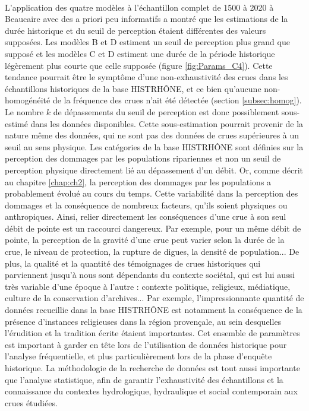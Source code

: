 	\paragraph{} L'application des quatre modèles à l'échantillon complet de 1500 à 2020 à Beaucaire avec des a priori peu informatifs a montré que les estimations de la durée historique et du seuil de perception étaient différentes des valeurs supposées. Les modèles B et D estiment un seuil de perception plus grand que supposé et les modèles C et D estiment une durée de la période historique légèrement plus courte que celle supposée (figure \ref{fig:Params_C4}). Cette tendance pourrait être le symptôme d'une non-exhaustivité des crues dans les échantillons historiques de la base HISTRHÔNE, et ce bien qu'aucune non-homogénéité de la fréquence des crues n'ait été détectée (section \ref{subsec:homog}). Le nombre $k$ de dépassements du seuil de perception est donc possiblement sous-estimé dans les données disponibles. Cette sous-estimation pourrait provenir de la nature même des données, qui ne sont pas des données de crues supérieures à un seuil au sens physique. Les catégories de la base HISTRHÔNE sont définies sur la perception des dommages par les populations ripariennes et non un seuil de perception physique directement lié au dépassement d'un débit. Or, comme décrit au chapitre \ref{chap:ch2}, la perception des dommages par les populations a probablement évolué au cours du temps. Cette variabilité dans la perception des dommages et la conséquence de nombreux facteurs, qu'ils soient physiques ou anthropiques. Ainsi, relier directement les conséquences d'une crue à son seul débit de pointe est un raccourci dangereux. Par exemple, pour un même débit de pointe, la perception de la gravité d'une crue peut varier selon la durée de la crue, le niveau de protection, la rupture de digues, la densité de population... De plus, la qualité et la quantité des témoignages de crues historiques qui parviennent jusqu'à nous sont dépendants du contexte sociétal, qui est lui aussi très variable d'une époque à l'autre : contexte politique, religieux, médiatique, culture de la conservation d'archives... Par exemple, l'impressionnante quantité de données recueillie dans la base HISTRHÔNE est notamment la conséquence de la présence d'instances religieuses dans la région provençale, au sein desquelles l'érudition et la tradition écrite étaient importantes. Cet ensemble de paramètres est important à garder en tête lors de l'utilisation de données historique pour l'analyse fréquentielle, et plus particulièrement lors de la phase d'enquête historique. La méthodologie de la recherche de données est tout aussi importante que l'analyse statistique, afin de garantir l'exhaustivité des échantillons et la connaissance du contextes hydrologique, hydraulique et social contemporain aux crues étudiées. 	
	
